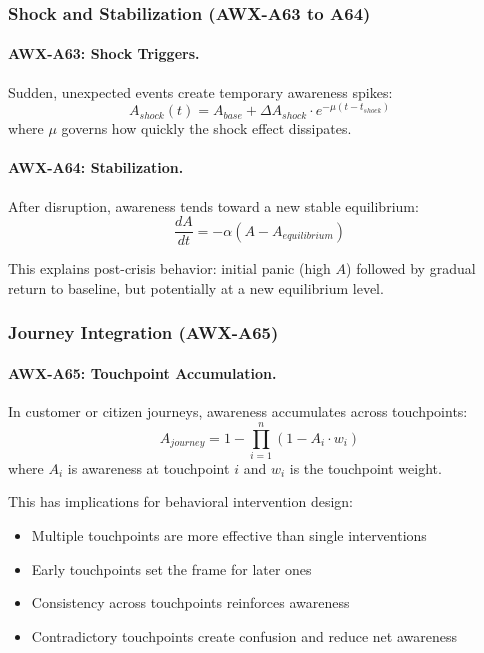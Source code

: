 \subsubsection{Shock and Stabilization (AWX-A63 to A64)}

\paragraph{AWX-A63: Shock Triggers.}
Sudden, unexpected events create temporary awareness spikes:
\begin{equation}
A_{shock}(t) = A_{base} + \Delta A_{shock} \cdot e^{-\mu(t-t_{shock})}
\end{equation}
where $\mu$ governs how quickly the shock effect dissipates.

\paragraph{AWX-A64: Stabilization.}
After disruption, awareness tends toward a new stable equilibrium:
\begin{equation}
\frac{dA}{dt} = -\alpha(A - A_{equilibrium})
\end{equation}

This explains post-crisis behavior: initial panic (high $A$) followed by 
gradual return to baseline, but potentially at a new equilibrium level.

\subsubsection{Journey Integration (AWX-A65)}

\paragraph{AWX-A65: Touchpoint Accumulation.}
In customer or citizen journeys, awareness accumulates across touchpoints:
\begin{equation}
A_{journey} = 1 - \prod_{i=1}^{n}(1 - A_i \cdot w_i)
\end{equation}
where $A_i$ is awareness at touchpoint $i$ and $w_i$ is the touchpoint weight.

This has implications for behavioral intervention design:
\begin{itemize}
    \item Multiple touchpoints are more effective than single interventions
    \item Early touchpoints set the frame for later ones
    \item Consistency across touchpoints reinforces awareness
    \item Contradictory touchpoints create confusion and reduce net awareness
\end{itemize}

